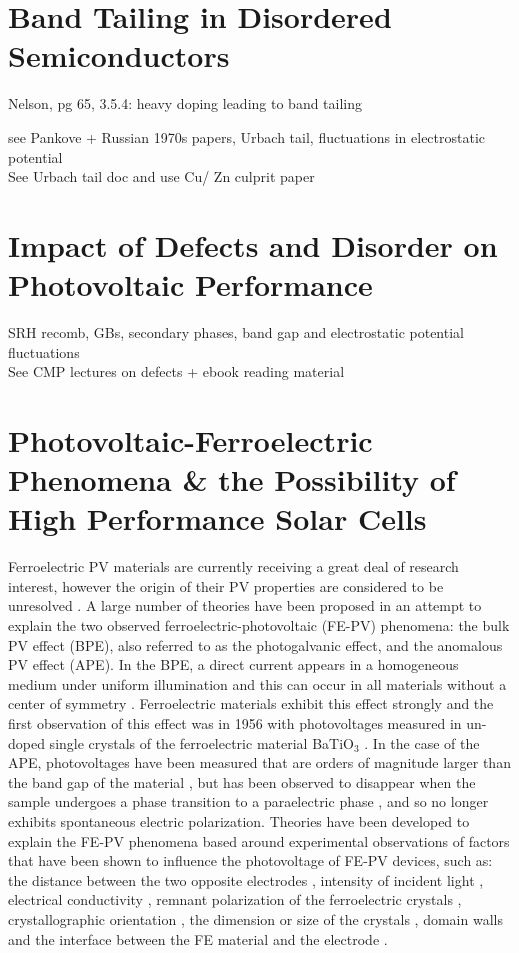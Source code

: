 \section{Band Tailing in Disordered Semiconductors}
Nelson, pg 65, 3.5.4: heavy doping leading to band tailing

see Pankove + Russian 1970s papers, Urbach tail, fluctuations in electrostatic potential\\
See Urbach tail doc and use Cu/ Zn culprit paper

\section{Impact of Defects and Disorder on Photovoltaic Performance}\label{defects_in_PV}
SRH recomb, GBs, secondary phases, band gap and electrostatic potential fluctuations\\
See CMP lectures on defects + ebook reading material 

\section{Photovoltaic-Ferroelectric Phenomena \& the Possibility of High Performance Solar Cells}\label{FE_PV_section}

Ferroelectric PV materials are currently receiving a great deal of research interest, however the origin of their PV properties are considered to be unresolved \cite{Rappe}. A large number of theories have been proposed in an attempt to explain the two observed ferroelectric-photovoltaic (FE-PV) phenomena: the bulk PV effect (BPE), also referred to as the photogalvanic effect, and the anomalous PV effect (APE). In the BPE, a direct current appears in a homogeneous medium under uniform illumination and this can occur in all materials without a center of symmetry  \cite{PGE}. Ferroelectric materials exhibit this effect strongly \cite{Rappe} and the first observation of this effect was in 1956 with photovoltages measured in un-doped single crystals of the ferroelectric material BaTiO$_3$ \cite{keith_46}. In the case of the APE, photovoltages have been measured that are orders of magnitude larger than the band gap of the material \cite{keith_54}, but has been observed to disappear when the sample undergoes a phase transition to a paraelectric phase \cite{nonlinear_dielectric}, and so no longer exhibits spontaneous electric polarization. Theories have been developed to explain the FE-PV phenomena based around experimental observations of factors that have been shown to influence the photovoltage of FE-PV devices, such as:  the distance between the two opposite electrodes \cite{rev_28,rev_46}, intensity of incident light \cite{rev_47}, electrical conductivity \cite{Fridkin}, remnant polarization of the
ferroelectric crystals \cite{rev_48}, crystallographic orientation \cite{rev_49}, the dimension or size of the crystals \cite{rev_46, rev_50}, domain walls \cite{rev_30}
and the interface between the FE material and the electrode \cite{rev_37}.\\

